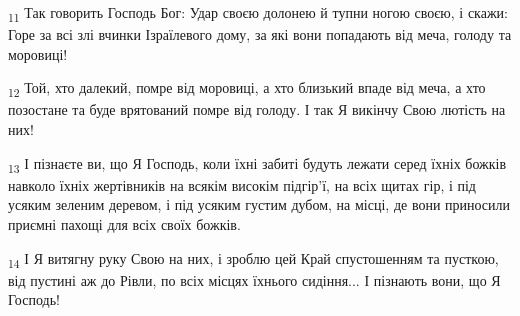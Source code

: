 \begin{tcolorbox}
\textsubscript{11} Так говорить Господь Бог: Удар своєю долонею й тупни ногою своєю, і скажи: Горе за всі злі вчинки Ізраїлевого дому, за які вони попадають від меча, голоду та моровиці!
\end{tcolorbox}
\begin{tcolorbox}
\textsubscript{12} Той, хто далекий, помре від моровиці, а хто близький впаде від меча, а хто позостане та буде врятований помре від голоду. І так Я викінчу Свою лютість на них!
\end{tcolorbox}
\begin{tcolorbox}
\textsubscript{13} І пізнаєте ви, що Я Господь, коли їхні забиті будуть лежати серед їхніх божків навколо їхніх жертівників на всякім високім підгір'ї, на всіх щитах гір, і під усяким зеленим деревом, і під усяким густим дубом, на місці, де вони приносили приємні пахощі для всіх своїх божків.
\end{tcolorbox}
\begin{tcolorbox}
\textsubscript{14} І Я витягну руку Свою на них, і зроблю цей Край спустошенням та пусткою, від пустині аж до Рівли, по всіх місцях їхнього сидіння... І пізнають вони, що Я Господь!
\end{tcolorbox}
